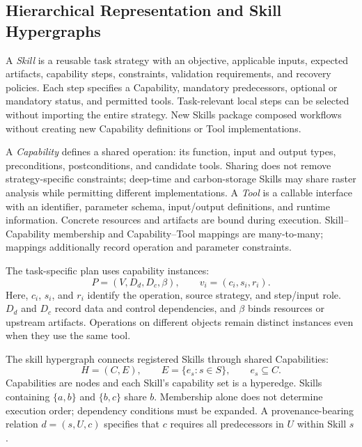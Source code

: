 \subsection{Hierarchical Representation and Skill Hypergraphs}
\label{sec:representation}
A \emph{Skill} is a reusable task strategy with an objective, applicable inputs, expected artifacts, capability steps, constraints, validation requirements, and recovery policies. Each step specifies a Capability, mandatory predecessors, optional or mandatory status, and permitted tools. Task-relevant local steps can be selected without importing the entire strategy. New Skills package composed workflows without creating new Capability definitions or Tool implementations.

A \emph{Capability} defines a shared operation: its function, input and output types, preconditions, postconditions, and candidate tools. Sharing does not remove strategy-specific constraints; deep-time and carbon-storage Skills may share raster analysis while permitting different implementations. A \emph{Tool} is a callable interface with an identifier, parameter schema, input/output definitions, and runtime information. Concrete resources and artifacts are bound during execution. Skill--Capability membership and Capability--Tool mappings are many-to-many; mappings additionally record operation and parameter constraints.

The task-specific plan uses capability instances:
\begin{equation}
P=(V,D_d,D_c,\beta),\qquad v_i=(c_i,s_i,r_i).
\label{eq:plan}
\end{equation}
Here, $c_i$, $s_i$, and $r_i$ identify the operation, source strategy, and step/input role. $D_d$ and $D_c$ record data and control dependencies, and $\beta$ binds resources or upstream artifacts. Operations on different objects remain distinct instances even when they use the same tool.

The skill hypergraph connects registered Skills through shared Capabilities:
\begin{equation}
H=(C,E),\qquad E=\{e_s:s\in S\},\qquad e_s\subseteq C.
\label{eq:hypergraph}
\end{equation}
Capabilities are nodes and each Skill's capability set is a hyperedge. Skills containing $\{a,b\}$ and $\{b,c\}$ share $b$. Membership alone does not determine execution order; dependency conditions must be expanded. A provenance-bearing relation $d=(s,U,c)$ specifies that $c$ requires all predecessors in $U$ within Skill $s$.
